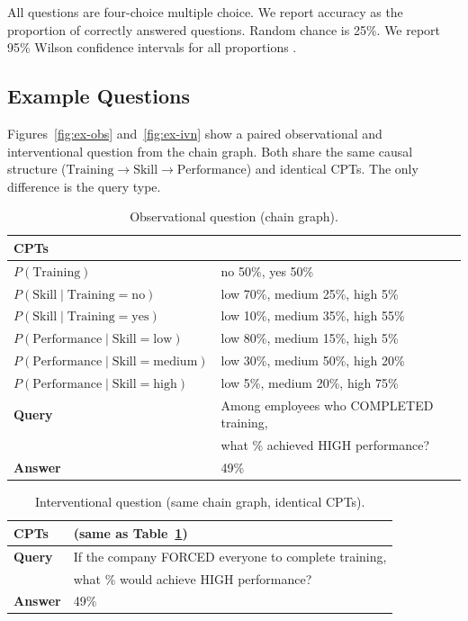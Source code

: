 \documentclass[11pt,a4paper]{article}
\begin{document}
All questions are four-choice multiple choice. We report accuracy as the proportion of correctly answered questions. Random chance is 25\%. We report 95\% Wilson confidence intervals for all proportions \cite{wilson1927probable}.

\subsection{Example Questions}

Figures~\ref{fig:ex-obs} and~\ref{fig:ex-ivn} show a paired observational and interventional question from the chain graph. Both share the same causal structure ($\text{Training} \rightarrow \text{Skill} \rightarrow \text{Performance}$) and identical CPTs. The only difference is the query type.

\begin{table}[h]
\centering
\caption{Observational question (chain graph).}
\label{tab:ex-obs}
\begin{tabular}{ll}
\toprule
\textbf{CPTs} & \\
\midrule
$P(\text{Training})$ & no 50\%, yes 50\% \\
$P(\text{Skill} \mid \text{Training}=\text{no})$ & low 70\%, medium 25\%, high 5\% \\
$P(\text{Skill} \mid \text{Training}=\text{yes})$ & low 10\%, medium 35\%, high 55\% \\
$P(\text{Performance} \mid \text{Skill}=\text{low})$ & low 80\%, medium 15\%, high 5\% \\
$P(\text{Performance} \mid \text{Skill}=\text{medium})$ & low 30\%, medium 50\%, high 20\% \\
$P(\text{Performance} \mid \text{Skill}=\text{high})$ & low 5\%, medium 20\%, high 75\% \\
\midrule
\textbf{Query} & Among employees who COMPLETED training, \\
 & what \% achieved HIGH performance? \\
\textbf{Answer} & 49\% \\
\bottomrule
\end{tabular}
\end{table}

\begin{table}[h]
\centering
\caption{Interventional question (same chain graph, identical CPTs).}
\label{tab:ex-ivn}
\begin{tabular}{ll}
\toprule
\textbf{CPTs} & (same as Table~\ref{tab:ex-obs}) \\
\midrule
\textbf{Query} & If the company FORCED everyone to complete training, \\
 & what \% would achieve HIGH performance? \\
\textbf{Answer} & 49\% \\
\bottomrule
\end{tabular}
\end{table}
\end{document}
